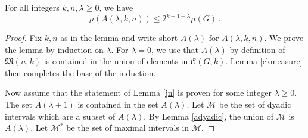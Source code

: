 \begin{lemma}\label{jn}
    For all integers $k,n,\lambda\ge 0$, we have
    \begin{equation}\label{alambdameasure}
        \mu(A(\lambda,k,n))        \le 2^{k+1-\lambda}\mu(G)\, .
    \end{equation}


\end{lemma}
\begin{proof}
Fix $k,n$ as in the lemma
and write short
$A(\lambda)$ for $A(\lambda,k,n)$.
We prove the lemma by induction on $\lambda$.
For $\lambda=0$, we use that $A(\lambda)$ by definition of $\mathfrak{M}(n,k)$ is contained in the union of elements in $ \mathcal{C}(G,k)$. Lemma \ref{ckmeasure} then completes  the base of the induction.

Now assume that the statement of Lemma \ref{jn}
is proven for some integer $\lambda\ge 0$.
The set $A(\lambda+1)$ is contained in the set $A(\lambda)$.
Let  $\mathcal{M}$ be the set of dyadic intervals which are a subset of $A(\lambda)$. By Lemma \ref{adyadic}, the union of $\mathcal{M}$ is $A(\lambda)$.
Let $\mathcal{M}^*$ be the set of maximal intervals in $\mathcal{M}$.


\end{proof}
